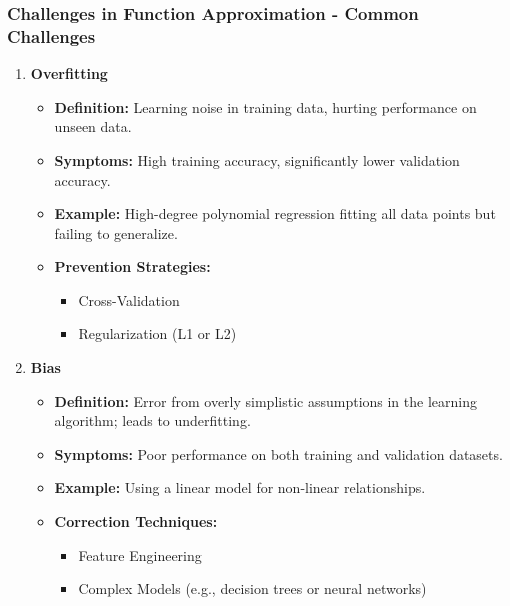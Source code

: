 \documentclass[aspectratio=169]{beamer}
\begin{document}
\begin{frame}[fragile]
    \frametitle{Challenges in Function Approximation - Common Challenges}
    \begin{enumerate}
        \item \textbf{Overfitting}
            \begin{itemize}
                \item \textbf{Definition:} Learning noise in training data, hurting performance on unseen data.
                \item \textbf{Symptoms:} High training accuracy, significantly lower validation accuracy.
                \item \textbf{Example:} High-degree polynomial regression fitting all data points but failing to generalize.
                \item \textbf{Prevention Strategies:}
                    \begin{itemize}
                        \item Cross-Validation
                        \item Regularization (L1 or L2)
                    \end{itemize}
            \end{itemize}

        \item \textbf{Bias}
            \begin{itemize}
                \item \textbf{Definition:} Error from overly simplistic assumptions in the learning algorithm; leads to underfitting.
                \item \textbf{Symptoms:} Poor performance on both training and validation datasets.
                \item \textbf{Example:} Using a linear model for non-linear relationships.
                \item \textbf{Correction Techniques:}
                    \begin{itemize}
                        \item Feature Engineering
                        \item Complex Models (e.g., decision trees or neural networks)
                    \end{itemize}
            \end{itemize}
    \end{enumerate}
\end{frame}
\end{document}
